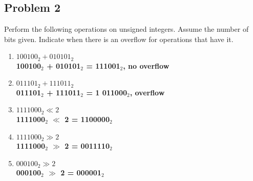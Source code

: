 \documentclass{article}
\begin{document}
\subsection*{Problem 2}
Perform the following operations on unsigned integers. Assume the number of bits given. Indicate when there is an overflow for operations that have it.
\begin{enumerate}[label=\alph*.]
    \item $100100_2 + 010101_2$\\
    \textbf{100100$_2$ + 010101$_2$ = 111001$_2$, no overflow}
    \item $011101_2 + 111011_2$\\
    \textbf{011101$_2$ + 111011$_2$ = 1 011000$_2$, overflow}
    \item $1111000_2 \ll 2$\\
    \textbf{1111000$_2$ $\ll$ 2 = 1100000$_2$}
    \item $1111000_2 \gg 2$\\
    \textbf{1111000$_2$ $\gg$ 2 = 0011110$_2$}
    \item $000100_2 \gg 2$\\
    \textbf{000100$_2$ $\gg$ 2 = 000001$_2$}
\end{enumerate}
\end{document}
